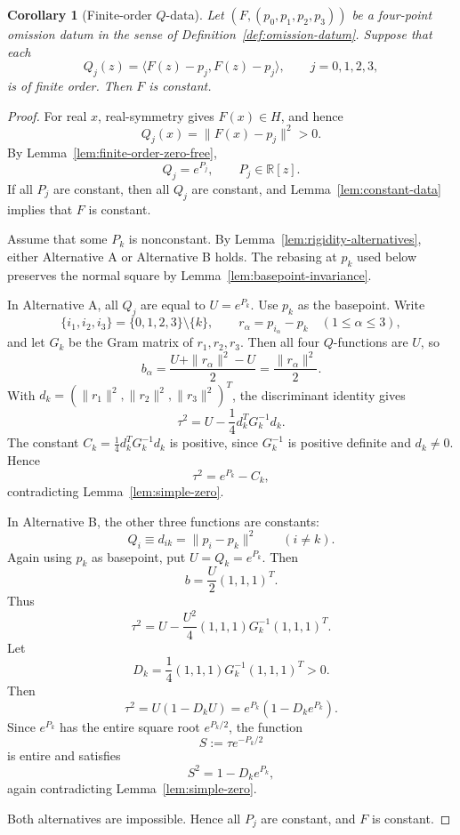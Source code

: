 \documentclass[10pt,a4paper]{amsart}
\newtheorem{corollary}{Corollary}
\def\HH{H}%
\newcommand{\RR}{\mathbb R}
\begin{document}
\begin{corollary}[Finite-order $Q$-data]\label{cor:finite-order-Q-data}
Let $(F,(p_0,p_1,p_2,p_3))$ be a four-point omission datum in the sense of Definition~\ref{def:omission-datum}. Suppose that each
\[
Q_j(z)=\langle F(z)-p_j,F(z)-p_j\rangle,\qquad j=0,1,2,3,
\]
is of finite order. Then $F$ is constant.
\end{corollary}

\begin{proof}
For real $x$, real-symmetry gives $F(x)\in\HH$, and hence
\[
Q_j(x)=\|F(x)-p_j\|^2>0.
\]
By Lemma~\ref{lem:finite-order-zero-free},
\[
Q_j=e^{P_j},\qquad P_j\in\RR[z].
\]
If all $P_j$ are constant, then all $Q_j$ are constant, and Lemma~\ref{lem:constant-data} implies that $F$ is constant.

Assume that some $P_k$ is nonconstant. By Lemma~\ref{lem:rigidity-alternatives}, either Alternative A or Alternative B holds.  The rebasing at $p_k$ used below preserves the normal square by Lemma~\ref{lem:basepoint-invariance}.

In Alternative A, all $Q_j$ are equal to $U=e^{P_k}$. Use $p_k$ as the basepoint. Write
\[
\{i_1,i_2,i_3\}=\{0,1,2,3\}\setminus\{k\},\qquad
r_\alpha=p_{i_\alpha}-p_k\quad(1\le \alpha\le3),
\]
and let $G_k$ be the Gram matrix of $r_1,r_2,r_3$. Then all four $Q$-functions are $U$, so
\[
b_\alpha=\frac{U+\|r_\alpha\|^2-U}{2}=\frac{\|r_\alpha\|^2}{2}.
\]
With $d_k=(\|r_1\|^2,\|r_2\|^2,\|r_3\|^2)^T$, the discriminant identity gives
\[
\tau^2=U-\frac14d_k^TG_k^{-1}d_k.
\]
The constant $C_k=\frac14d_k^TG_k^{-1}d_k$ is positive, since $G_k^{-1}$ is positive definite and $d_k\neq0$. Hence
\[
\tau^2=e^{P_k}-C_k,
\]
contradicting Lemma~\ref{lem:simple-zero}.

In Alternative B, the other three functions are constants:
\[
Q_i\equiv d_{ik}=\|p_i-p_k\|^2\qquad (i\neq k).
\]
Again using $p_k$ as basepoint, put $U=Q_k=e^{P_k}$. Then
\[
b=\frac U2(1,1,1)^T.
\]
Thus
\[
\tau^2=U-\frac{U^2}{4}(1,1,1)G_k^{-1}(1,1,1)^T.
\]
Let
\[
D_k=\frac14(1,1,1)G_k^{-1}(1,1,1)^T>0.
\]
Then
\[
\tau^2=U(1-D_kU)=e^{P_k}(1-D_ke^{P_k}).
\]
Since $e^{P_k}$ has the entire square root $e^{P_k/2}$, the function
\[
S:=\tau e^{-P_k/2}
\]
is entire and satisfies
\[
S^2=1-D_ke^{P_k},
\]
again contradicting Lemma~\ref{lem:simple-zero}.

Both alternatives are impossible. Hence all $P_j$ are constant, and $F$ is constant.
\end{proof}
\end{document}
